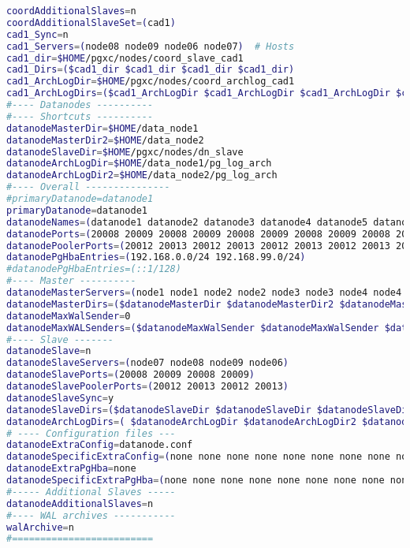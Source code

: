 \begin{lstlisting}[basicstyle=\tiny,language=bash,caption={Konfigurationsdatei pgxc-ctl}]
coordAdditionalSlaves=n	
coordAdditionalSlaveSet=(cad1)
cad1_Sync=n	
cad1_Servers=(node08 node09 node06 node07)	# Hosts
cad1_dir=$HOME/pgxc/nodes/coord_slave_cad1
cad1_Dirs=($cad1_dir $cad1_dir $cad1_dir $cad1_dir)
cad1_ArchLogDir=$HOME/pgxc/nodes/coord_archlog_cad1
cad1_ArchLogDirs=($cad1_ArchLogDir $cad1_ArchLogDir $cad1_ArchLogDir $cad1_ArchLogDir)
#---- Datanodes ----------
#---- Shortcuts ----------
datanodeMasterDir=$HOME/data_node1
datanodeMasterDir2=$HOME/data_node2
datanodeSlaveDir=$HOME/pgxc/nodes/dn_slave
datanodeArchLogDir=$HOME/data_node1/pg_log_arch
datanodeArchLogDir2=$HOME/data_node2/pg_log_arch
#---- Overall ---------------
#primaryDatanode=datanode1
primaryDatanode=datanode1
datanodeNames=(datanode1 datanode2 datanode3 datanode4 datanode5 datanode6 datanode7 datanode8 datanode9 datanode10 datanode11 datanode12)
datanodePorts=(20008 20009 20008 20009 20008 20009 20008 20009 20008 20009 20008 20009)
datanodePoolerPorts=(20012 20013 20012 20013 20012 20013 20012 20013 20012 20013 20012 20013)
datanodePgHbaEntries=(192.168.0.0/24 192.168.99.0/24)
#datanodePgHbaEntries=(::1/128)
#---- Master ----------
datanodeMasterServers=(node1 node1 node2 node2 node3 node3 node4 node4 node5 node5 node6 node6)	
datanodeMasterDirs=($datanodeMasterDir $datanodeMasterDir2 $datanodeMasterDir $datanodeMasterDir2 $datanodeMasterDir $datanodeMasterDir2 $datanodeMasterDir $datanodeMasterDir2 $datanodeMasterDir $datanodeMasterDir2 $datanodeMasterDir $datanodeMasterDir2)
datanodeMaxWalSender=0	
datanodeMaxWALSenders=($datanodeMaxWalSender $datanodeMaxWalSender $datanodeMaxWalSender $datanodeMaxWalSender $datanodeMaxWalSender $datanodeMaxWalSender $datanodeMaxWalSender $datanodeMaxWalSender $datanodeMaxWalSender $datanodeMaxWalSender $datanodeMaxWalSender $datanodeMaxWalSender)
#---- Slave -------
datanodeSlave=n		
datanodeSlaveServers=(node07 node08 node09 node06)
datanodeSlavePorts=(20008 20009 20008 20009)
datanodeSlavePoolerPorts=(20012 20013 20012 20013)
datanodeSlaveSync=y	
datanodeSlaveDirs=($datanodeSlaveDir $datanodeSlaveDir $datanodeSlaveDir $datanodeSlaveDir)
datanodeArchLogDirs=( $datanodeArchLogDir $datanodeArchLogDir2 $datanodeArchLogDir $datanodeArchLogDir2 $datanodeArchLogDir $datanodeArchLogDir2 $datanodeArchLogDir $datanodeArchLogDir2 $datanodeArchLogDir $datanodeArchLogDir2 $datanodeArchLogDir $datanodeArchLogDir2 )
# ---- Configuration files ---
datanodeExtraConfig=datanode.conf	
datanodeSpecificExtraConfig=(none none none none none none none none none none none none)
datanodeExtraPgHba=none	
datanodeSpecificExtraPgHba=(none none none none none none none none none none none none)
#----- Additional Slaves -----
datanodeAdditionalSlaves=n
#---- WAL archives -----------
walArchive=n
#=========================


\end{lstlisting}
